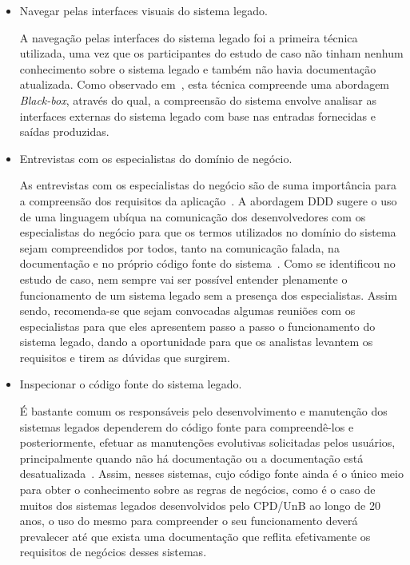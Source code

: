 \begin{itemize}

	\item Navegar pelas interfaces visuais do sistema legado. 

A navegação pelas interfaces do sistema 
legado foi a primeira técnica utilizada,
uma vez que os participantes do estudo de caso 
não tinham nenhum conhecimento 
sobre o sistema legado e também 
não havia documentação atualizada. 
Como observado em~\cite{S12_WeidermanApproaches:1997},
esta técnica compreende uma abordagem
\textit{Black-box}, através do qual, a compreensão do sistema 
envolve analisar as interfaces externas do sistema legado
com base nas entradas fornecidas e saídas produzidas.

	\item Entrevistas com os especialistas do domínio de negócio.

As entrevistas com os especialistas do negócio 
são de suma importância
para a compreensão dos requisitos da aplicação~\cite{OORP2013}. 
A abordagem \acrshort{DDD} sugere 
o uso de uma linguagem ubíqua na
comunicação dos desenvolvedores
com os especialistas do negócio para
que os termos utilizados no domínio 
do sistema sejam compreendidos por todos,
tanto na comunicação falada, 
na documentação e no próprio código fonte
do sistema~\cite{evans2004domain}.
Como se identificou no estudo de caso, nem sempre vai 
ser possível entender plenamente o funcionamento de 
um sistema legado
sem a presença dos especialistas. 
Assim sendo, recomenda-se que sejam convocadas
algumas reuniões com os especialistas para que eles apresentem
passo a passo o funcionamento do sistema legado, 
dando a oportunidade para que os analistas 
levantem os requisitos e tirem as dúvidas que surgirem.


	\item Inspecionar o código fonte do sistema legado.
	
É bastante comum os responsáveis pelo
desenvolvimento e manutenção dos sistemas legados
dependerem do código fonte para compreendê-los
e posteriormente, efetuar as manutenções
evolutivas solicitadas pelos usuários, 
principalmente quando não há documentação ou 
a documentação está desatualizada~\cite{S01_bennett2000software,S3_Bisbal:1999, Seacord:2003, S04_IntLgSw:2006}.
Assim, nesses sistemas,
cujo código fonte ainda é o único
meio para obter o conhecimento sobre
as regras de negócios, 
como é o caso 
de muitos dos sistemas legados
desenvolvidos pelo CPD/UnB ao longo de 20 anos,
o uso do mesmo para compreender 
o seu funcionamento deverá prevalecer até que exista
uma documentação que reflita efetivamente
os requisitos de negócios desses sistemas.


\end{itemize}
